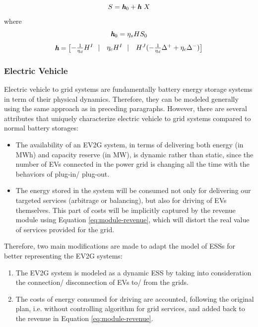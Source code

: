 \begin{equation}
\label{eq:state-ESS-M-1}
S = \textit{\textbf{h}}_0 + \textit{\textbf{h}}~X
\end{equation}
where
\begin{equation}
\label{eq:state-ESS-M-2}
\textit{\textbf{h}}_0 =  \eta_s H S_0
\end{equation}
\begin{equation}
\label{eq:state-ESS-M-3}
\textit{\textbf{h}} = \begin{bmatrix}
-\frac{1}{\eta_d} H^I~~|& \eta_c H^I~~|& H^J (-\frac{1}{\eta_d} \Delta^{+} + \eta_c \Delta^{-})
\end{bmatrix}
\end{equation}
\subsubsection{Electric Vehicle}

Electric vehicle to grid systems are fundamentally battery energy storage systems in term of their physical dynamics. Therefore, they can be modeled generally using the same approach as in preceding paragraphs. However, there are several attributes that uniquely characterize electric vehicle to grid systems compared to normal battery storages:

\begin{itemize}
	\item The availability of an EV2G system, in terms of delivering both energy (in MWh) and capacity reserve (in MW), is dynamic rather than static, since the number of EVs connected in the power grid is changing all the time with the behaviors of plug-in/ plug-out.
	\item The energy stored in the system will be consumed not only for delivering our targeted services (arbitrage or balancing), but also for driving of EVs themselves. This part of costs will be implicitly captured by the revenue module using Equation \eqref{eq:module-revenue}, which will distort the real value of services provided for the grid. 
\end{itemize}

Therefore, two main modifications are made to adapt the model of ESSs for better representing the EV2G systems: 

\begin{enumerate}
	\item The EV2G system is modeled as a dynamic ESS by taking into consideration the connection/ disconnection of EVs to/ from the grids.
	\item The costs of energy consumed for driving are accounted, following the original plan, i.e. without controlling algorithm for grid services, and added back to the revenue in Equation \eqref{eq:module-revenue}.
\end{enumerate}

